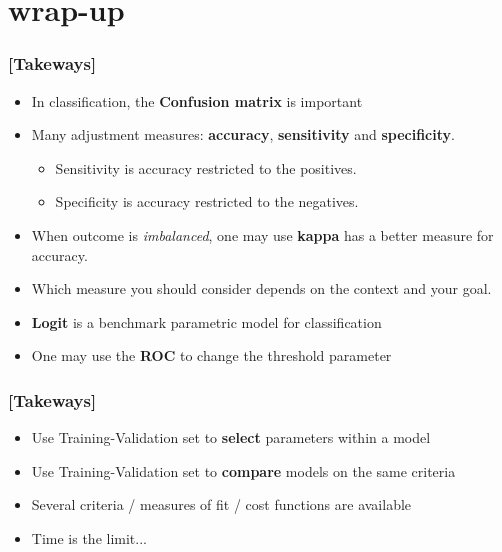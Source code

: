 \documentclass[xcolor=x11names,compress]{beamer}
\renewcommand{\(}{\begin{columns}}
\renewcommand{\)}{\end{columns}}
\newcommand{\<}[1]{\begin{column}{#1}}
\renewcommand{\>}{\end{column}}
\begin{document}
\section{wrap-up}

\begin{frame} %
\frametitle{\textcolor{brique}{[Takeways]}}
\begin{itemize}[<+->]
  \item In classification, the \textbf{Confusion matrix} is important
 \item Many adjustment measures:  \textbf{accuracy}, \textbf{sensitivity} and \textbf{specificity}.
    \begin{itemize}[<+->]
      \item Sensitivity is accuracy restricted to the positives.
      \item Specificity is accuracy restricted to the negatives.
   \end{itemize}
 \item When  outcome is \textit{imbalanced}, one may use \textbf{kappa} has a better measure for accuracy.
  \item[] Which measure you should consider depends on the context and your goal.
 \item \textbf{Logit} is a benchmark parametric model for classification
 \item[] One may use the \textbf{ROC} to change the threshold parameter
\end{itemize}
\end{frame}

\begin{frame} %
\frametitle{\textcolor{brique}{[Takeways]}}
\begin{itemize}[<+->]
  \item Use Training-Validation set to \textbf{select} parameters within a model
  \item Use Training-Validation set to \textbf{compare} models on the same criteria
  \item Several criteria / measures of fit / cost functions are available
  \item Time is the limit...
\end{itemize}
\end{frame}

\end{document}
